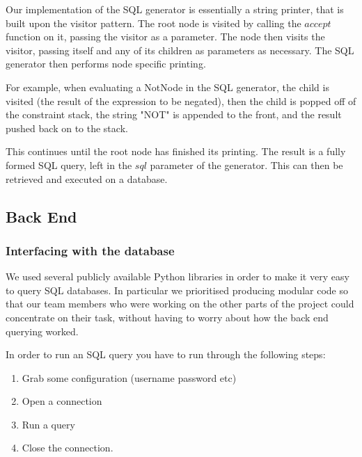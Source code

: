 \documentclass[a4paper, 11pt]{article}
\begin{document}
        Our implementation of the SQL generator is essentially a string
        printer, that is built upon the visitor pattern. The root node is
        visited by calling the $accept$ function on it, passing the visitor as
        a parameter. The node then visits the visitor, passing itself and any
        of its children as parameters as necessary. The SQL generator then
        performs node specific printing. 

        For example, when evaluating a NotNode in the SQL generator, the child
        is visited (the result of the expression to be negated), then the child
        is popped off of the constraint stack, the string "NOT" is appended to
        the front, and the result pushed back on to the stack.

        This continues until the root node has finished its printing. The
        result is a fully formed SQL query, left in the $sql$ parameter of the
        generator. This can then be retrieved and executed on a database.

    \subsection{Back End}


    \subsubsection{Interfacing with the database}

      We used several publicly available Python libraries in order to make 
      it very easy to query SQL databases. In particular we prioritised
      producing modular code so that our team members who were working on the
      other parts of the project could concentrate on their task, without having
      to worry about how the back end querying worked.

      In order to run an SQL query you have to run through the following steps:
      
      \begin{enumerate}
        \item Grab some configuration (username password etc)
        \item Open a connection
        \item Run a query
        \item Close the connection.
      \end{enumerate}
\end{document}
